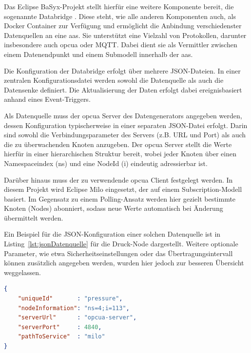

Das Eclipse BaSyx-Projekt stellt hierfür eine weitere Komponente bereit, die sogenannte Databridge \cite{BaSyxDatabridge}.
Diese steht, wie alle anderen Komponenten auch, als Docker Container zur Verfügung und ermöglicht die Anbindung verschiedenster Datenquellen an eine \acs{aas}.
Sie unterstützt eine Vielzahl von Protokollen, darunter insbesondere auch \acs{opcua} oder MQTT.
Dabei dient sie als Vermittler zwischen einem Datenendpunkt und einem Submodell innerhalb der \acs{aas}.

Die Konfiguration der Databridge erfolgt über mehrere JSON-Dateien.
In einer zentralen Konfigurationsdatei werden sowohl die Datenquelle als auch die Datensenke definiert.
Die Aktualisierung der Daten erfolgt dabei ereignisbasiert anhand eines Event-Triggers.

Als Datenquelle muss der \acs{opcua} Server des Datengenerators angegeben werden, dessen Konfiguration typischerweise in einer separaten JSON-Datei erfolgt.
Darin sind sowohl die Verbindungsparameter des Servers (z.B. URL und Port) als auch die zu überwachenden Knoten anzugeben.
Der \acs{opcua} Server stellt die Werte hierfür in einer hierarchischen Struktur bereit, wobei jeder Knoten über einen Namespaceindex (ns) und eine NodeId (i) eindeutig adressierbar ist.

Darüber hinaus muss der zu verwendende \acs{opcua} Client festgelegt werden.
In diesem Projekt wird Eclipse Milo eingesetzt, der auf einem Subscription-Modell basiert.
Im Gegensatz zu einem Polling-Ansatz werden hier gezielt bestimmte Knoten (Nodes) abonniert, sodass neue Werte automatisch bei Änderung übermittelt werden.

Ein Beispiel für die JSON-Konfiguration einer solchen Datenquelle ist in Listing~\ref{lst:jsonDatenquelle} für die Druck-Node dargestellt.
Weitere optionale Parameter, wie etwa Sicherheitseinstellungen oder das Übertragungsintervall können zusätzlich angegeben werden, wurden hier jedoch zur besseren Übersicht weggelassen.

\begin{lstlisting}[language=json, caption={Beispielhafte JSON-Konfiguration einer Datenquelle}, label={lst:jsonDatenquelle}]
{
    "uniqueId"       : "pressure",
    "nodeInformation": "ns=4;i=113",
    "serverUrl"      : "opcua-server",
    "serverPort"     : 4840,
    "pathToService"  : "milo"
}
\end{lstlisting}

